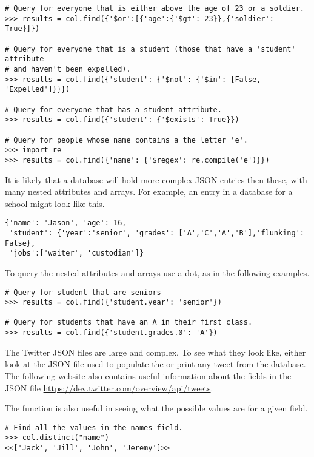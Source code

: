 \begin{lstlisting}
# Query for everyone that is either above the age of 23 or a soldier.
>>> results = col.find({'$or':[{'age':{'$gt': 23}},{'soldier': True}]})

# Query for everyone that is a student (those that have a 'student' attribute
# and haven't been expelled).
>>> results = col.find({'student': {'$not': {'$in': [False, 'Expelled']}}})

# Query for everyone that has a student attribute.
>>> results = col.find({'student': {'$exists': True}})

# Query for people whose name contains a the letter 'e'.
>>> import re
>>> results = col.find({'name': {'$regex': re.compile('e')}})
\end{lstlisting}

It is likely that a database will hold more complex JSON entries then these, with many nested attributes and arrays.
For example, an entry in a database for a school might look like this.

\begin{lstlisting}
{'name': 'Jason', 'age': 16,
 'student': {'year':'senior', 'grades': ['A','C','A','B'],'flunking': False},
 'jobs':['waiter', 'custodian']}
\end{lstlisting}

To query the nested attributes and arrays use a dot, as in the following examples.

\begin{lstlisting}
# Query for student that are seniors
>>> results = col.find({'student.year': 'senior'})

# Query for students that have an A in their first class.
>>> results = col.find({'student.grades.0': 'A'})
\end{lstlisting}

The Twitter JSON files are large and complex.
To see what they look like, either look at the JSON file used to populate the  or print any tweet from the database.
The following website also contains useful information about the fields in the JSON file \url{https://dev.twitter.com/overview/api/tweets}.

The  function is also useful in seeing what the possible values are for a given field.

\begin{lstlisting}
# Find all the values in the names field.
>>> col.distinct("name")
<<['Jack', 'Jill', 'John', 'Jeremy']>>
\end{lstlisting}

